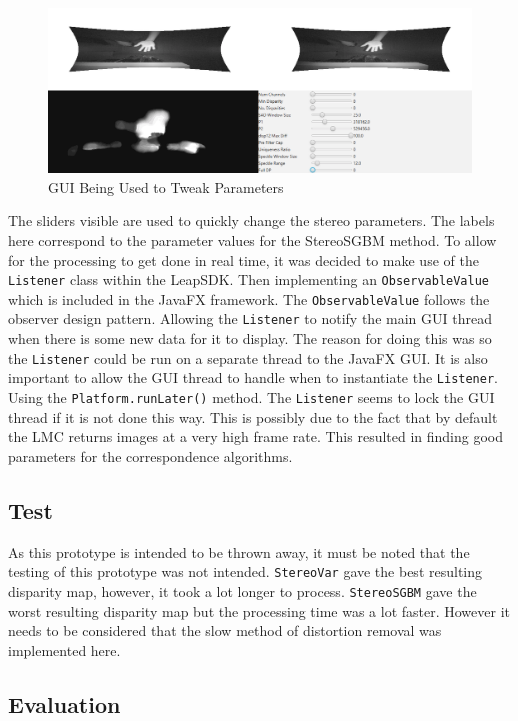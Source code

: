 \documentclass[11pt,oneside]{report}
\newcommand\code[1]{\texttt{#1}}
\begin{document}
		\begin{figure}
			\centering
    				\includegraphics[width=\textheight,angle=90]{first_test}
    				\caption{GUI Being Used to Tweak Parameters \protect {\label{fig:ui}}}
		\end{figure}	
		The sliders visible are used to quickly change the stereo parameters.
		The labels here correspond to the parameter values for the StereoSGBM method.
		To allow for the processing to get done in real time, it was decided to make use of the \code{Listener} class within the LeapSDK.
		Then implementing an \code{ObservableValue} which is included in the JavaFX framework.
		The \code{ObservableValue} follows the observer design pattern.
		Allowing the \code{Listener} to notify the main GUI thread when there is some new data for it to display.
		The reason for doing this was so the \code{Listener} could be run on a separate thread to the JavaFX GUI.
		It is also important to allow the GUI thread to handle when to instantiate the \code{Listener}.
		Using the \code{Platform.runLater()} method.
		The \code{Listener} seems to lock the GUI thread if it is not done this way.
		This is possibly due to the fact that by default the LMC returns images at a very high frame rate.
		This resulted in finding good parameters for the correspondence algorithms.
		\subsection{Test}
		As this prototype is intended to be thrown away, it must be noted that the testing of this prototype was not intended.
		\code{StereoVar} gave the best resulting disparity map, however, it took a lot longer to process.
		\code{StereoSGBM} gave the worst resulting disparity map but the processing time was a lot faster.
		However it needs to be considered that the slow method of distortion removal was implemented here.
		\subsection{Evaluation}
\end{document}
